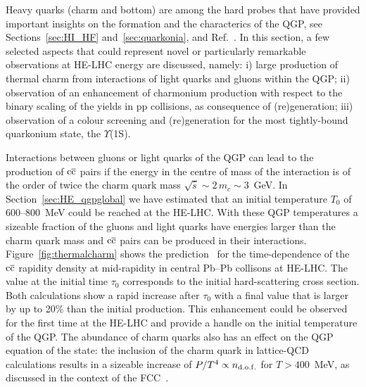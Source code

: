 \documentclass[../report.tex]{subfiles}
\begin{document}
Heavy quarks (charm and bottom) are among the hard probes that have
provided important insights on the formation and the characterics of
the QGP, see Sections~\ref{sec:HI_HF} and~\ref{sec:quarkonia}, and Ref.~\cite{Andronic:2015wma}.
In this section,
a few selected aspects that could
represent novel or particularly remarkable observations at HE-LHC
energy are discussed,
namely: i) large production of thermal charm from
  interactions of light quarks and gluons within the QGP;
ii) observation of an enhancement of charmonium production with
  respect to the binary scaling of the yields in pp collisions, as
  consequence of (re)generation;
iii) observation of a colour screening and (re)generation for the most tightly-bound
  quarkonium state, the $\Upsilon$(1S).

Interactions between gluons or light quarks of the QGP can lead to the
production of $\rm c\overline c$ pairs if the energy in the centre of mass 
of the interaction is of the order of twice the charm quark mass
$\sqrt{\hat s}\sim 2\,m_c\sim 3$~GeV. 
In Section~\ref{sec:HE_qgpglobal} we have estimated 
that an initial temperature $T_0$ of 600--800~MeV could be
reached at the HE-LHC. 
With these QGP temperatures a sizeable fraction of the gluons and
light quarks have energies larger than the charm quark mass 
and $\rm c\overline c$ pairs can be produced in their interactions. 
Figure~\ref{fig:thermalcharm} shows the prediction~\cite{Liu:2016zle} for the time-dependence of the $\rm c\overline c$
rapidity density at mid-rapidity in central Pb--Pb collisons at HE-LHC. The value at the initial time
$\tau_0$ corresponds to the initial hard-scattering cross section.
Both calculations show a rapid increase
after $\tau_0$ with a final value that is larger by up to 20\% than
the initial production. 
This enhancement could be observed for the first time at the HE-LHC
and provide a handle on the initial
temperature of the QGP. 
The abundance of charm quarks also has an effect on the QGP equation
of the state: 
the inclusion of the charm quark in lattice-QCD calculations results in a sizeable 
increase of $P/T^4 \propto n_{\rm d.o.f.}$ for $T>400$~MeV, as
discussed in the context of the FCC~\cite{Dainese:2016gch}.  
\end{document}
